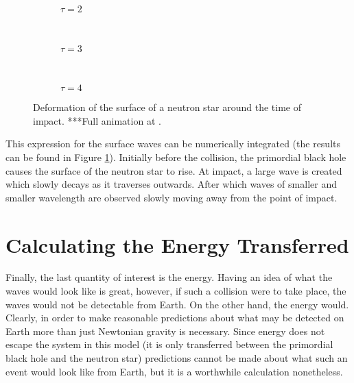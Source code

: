 \begin{figure}[p] \ContinuedFloat
\begin{centering}
 \begin{subfigure}{\textwidth}
  
  \caption{$\tau = 2$}
 \end{subfigure} \\
 \begin{subfigure}{\textwidth}
  
  \caption{$\tau = 3$}
 \end{subfigure} \\
  \begin{subfigure}{\textwidth}
  
  \caption{$\tau = 4$}
 \end{subfigure}
 \end{centering}
 \caption[Analytic Deformation of the Neutron Star]{Deformation of the surface of a neutron star around the time of impact. ***Full animation at .}
 \label{fig:eta}
\end{figure}

This expression for the surface waves can be numerically integrated (the results can be found in Figure \ref{fig:eta}). Initially before the collision, the primordial black hole causes the surface of the neutron star to rise. At impact, a large wave is created which slowly decays as it traverses outwards. After which waves of smaller and smaller wavelength are observed slowly moving away from the point of impact.

\section{Calculating the Energy Transferred}
\label{chap:energy}

Finally, the last quantity of interest is the energy. Having an idea of what the waves would look like is great, however, if such a collision were to take place, the waves would not be detectable from Earth. On the other hand, the energy would. Clearly, in order to make reasonable predictions about what may be detected on Earth more than just Newtonian gravity is necessary. Since energy does not escape the system in this model (it is only transferred between the primordial black hole and the neutron star) predictions cannot be made about what such an event would look like from Earth, but it is a worthwhile calculation nonetheless. \\

